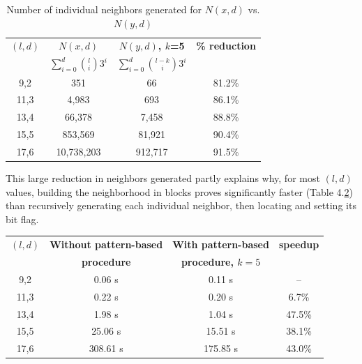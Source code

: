 \documentclass[oneside,12pt]{DISCSthesis}
\begin{document}
{		\begin{table}[h] %
			\small
			\renewcommand{\arraystretch}{1.3}
			\label{tbl:neighbors_blockmasking}
			\centering
			\begin{tabular}{|c|c|c|c|}
			\hline 
			\bfseries\boldmath $(l,d)$ & \bfseries\boldmath $N(x,d)$ & \bfseries\boldmath $N(y,d)$, $k$=5 & \bfseries \% reduction\\
			\bfseries & \bfseries\boldmath $\sum_{i=0}^{d} \binom{l}{i} 3^{i}$ & \bfseries\boldmath $\sum_{i=0}^{d} \binom{l-k}{i} 3^{i}$ & \\
			\hline
			 9,2 &         351  &       66 & 81.2\%\\
			11,3 &       4,983  &      693 & 86.1\%\\
			13,4 &      66,378  &    7,458 & 88.8\%\\
			15,5 &     853,569  &   81,921 & 90.4\%\\
			17,6 &  10,738,203  &  912,717 & 91.5\%\\
			\hline\end{tabular}

			\caption{\small Number of individual neighbors generated for $N(x,d)$ vs. $N(y,d)$}
			\end{table}

		\noindent This large reduction in neighbors generated partly explains why, for most $(l,d)$ values, building the neighborhood in blocks proves significantly faster (Table 4.\ref{tbl:speedup_blockmasking}) than recursively generating each individual neighbor, then locating and setting its bit flag. \newline 

		\begin{table}[h] %
			\small
			\renewcommand{\arraystretch}{1.3}
			\label{tbl:speedup_blockmasking}
			\centering
			\begin{tabular}{|c|c|c|c|}
			\hline 
			\bfseries\boldmath $(l,d)$ & \bfseries Without pattern-based & \bfseries With pattern-based & \bfseries speedup\\
			\bfseries & \bfseries procedure & \bfseries\boldmath procedure, $k=5$ & \bfseries\\
			\hline
			 9,2 &   0.06 s &    0.11 s &     --  \\
			11,3 &   0.22 s &    0.20 s &    6.7\%\\
			13,4 &   1.98 s &    1.04 s &   47.5\%\\
			15,5 &  25.06 s &   15.51 s &   38.1\%\\
			17,6 & 308.61 s &  175.85 s &   43.0\%\\
			\hline\end{tabular}


\end{table}}
\end{document}

